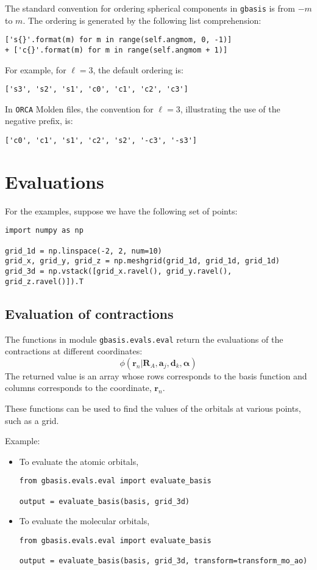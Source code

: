 \documentclass[letterpaper]{article}
\begin{document}
The standard convention for ordering spherical components in \verb|gbasis| is from $-m$ to $m$.
The ordering is generated by the following list comprehension:
\begin{lstlisting}
['s{}'.format(m) for m in range(self.angmom, 0, -1)]
+ ['c{}'.format(m) for m in range(self.angmom + 1)]
\end{lstlisting}
For example, for $\ell = 3$, the default ordering is:
\begin{lstlisting}
['s3', 's2', 's1', 'c0', 'c1', 'c2', 'c3']
\end{lstlisting}
In \verb|ORCA| Molden files, the convention for $\ell = 3$,
illustrating the use of the negative prefix, is:
\begin{lstlisting}
['c0', 'c1', 's1', 'c2', 's2', '-c3', '-s3']
\end{lstlisting}

\section{Evaluations}
For the examples, suppose we have the following set of points:
\begin{lstlisting}
import numpy as np

grid_1d = np.linspace(-2, 2, num=10)
grid_x, grid_y, grid_z = np.meshgrid(grid_1d, grid_1d, grid_1d)
grid_3d = np.vstack([grid_x.ravel(), grid_y.ravel(), grid_z.ravel()]).T
\end{lstlisting}

\subsection{Evaluation of contractions}
The functions in module \verb|gbasis.evals.eval| return the evaluations of the
contractions at different coordinates:
\begin{equation}
  \phi(\mathbf{r}_n | \mathbf{R}_{A}, \mathbf{a}_j, \mathbf{d}_k, \boldsymbol{\alpha})
\end{equation}
The returned value is an array whose rows corresponds to the basis function and
columns corresponds to the coordinate, $\mathbf{r}_n$.

These functions can be used to find the values of the orbitals at various
points, such as a grid.

Example:
\begin{itemize}
\item To evaluate the atomic orbitals,
  \begin{lstlisting}[xleftmargin=-25pt]
from gbasis.evals.eval import evaluate_basis

output = evaluate_basis(basis, grid_3d)
\end{lstlisting}
\item To evaluate the molecular orbitals,
  \begin{lstlisting}[xleftmargin=-25pt]
from gbasis.evals.eval import evaluate_basis

output = evaluate_basis(basis, grid_3d, transform=transform_mo_ao)
\end{lstlisting}
\end{itemize}
\end{document}
